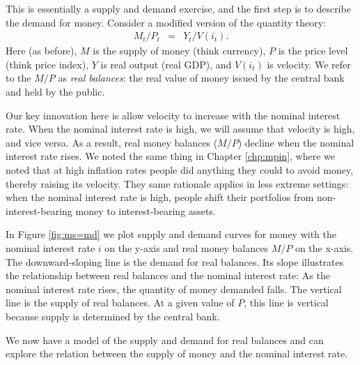 This is essentially a supply and demand exercise,
and the first step is to describe the demand for money.
Consider a modified version of the quantity theory:
\begin{eqnarray}
    M_t/P_t  &=&  Y_t / V(i_t).
    \label{eq:md}
\end{eqnarray}
Here (as before), $M$ is the supply of money (think currency),
$P$ is the price level (think price index),
$Y$ is real output (real GDP),
and $V(i_t)$ is velocity.
We refer to the $M/P$ as {\it real balances\/}:  the real value of money
issued by the central bank  and held by the public.

Our key innovation here is allow velocity to increase with the nominal interest rate.
When the nominal interest rate is high, we will assume that velocity is high,
and vice versa.
As a result, real money balances ($M/P$) decline when the nominal interest rate rises.
We noted the same thing in Chapter \ref{chp:mpin},
where we noted that at high inflation rates people did anything they could to avoid money,
thereby raising its velocity.
They same rationale applies in less extreme settings:
when the nominal interest rate is high,
people shift their portfolios from non-interest-bearing money to interest-bearing assets.


In Figure \ref{fig:ms=md} we plot supply and demand curves for money with the
nominal interest rate $i$ on the y-axis and real money balances $M/P$ on the x-axis.
The downward-sloping line is the demand for real balances.
Its slope illustrates the relationship between real balances and the nominal interest rate:
As the nominal interest rate rises, the quantity of money demanded falls.
The vertical line is the supply of real balances.
At a given value of $P$, this line is vertical
because supply is determined by the central bank. 

We now have a model of the supply and demand for real balances
and can explore the relation between the supply of money and the nominal interest rate.

